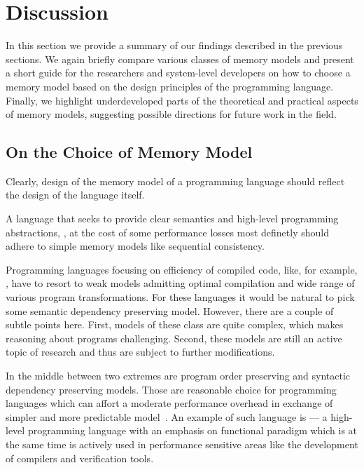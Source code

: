 \section{Discussion}
\label{sec:discussion}

In this section we provide a summary of our findings described in the previous sections. 
We again briefly compare various classes of memory models 
and present a short guide for the researchers and system-level developers 
on how to choose a memory model based 
on the design principles of the programming language.   
Finally, we highlight underdeveloped parts of the theoretical
and practical aspects of memory models, suggesting 
possible directions for future work in the field. 


\subsection{On the Choice of  Memory Model}

Clearly, design of the memory model of a programming language
should reflect the design of the language itself. 

A language that seeks to provide clear semantics and 
high-level programming abstractions, \eg \Haskell, at the cost 
of some performance losses most definetly should 
adhere to simple memory models like sequential consistency. 

Programming languages focusing on efficiency 
of compiled code, like, for example, \CPP, 
have to resort to weak models admitting 
optimal compilation and wide range of 
various program transformations. 
For these languages it would be natural 
to pick some semantic dependency preserving model. 
However, there are a couple of subtle points here. 
First, models of these class are quite complex, 
which makes reasoning about programs challenging. 
Second, these models are still an active topic 
of research and thus are subject to further modifications.

In the middle between two extremes are program order preserving and 
syntactic dependency preserving models.
Those are reasonable choice for programming languages
which can affort a moderate performance overhead 
in exchange of simpler and more predictable model~\cite{Ou-Demsky:OOPSLA18}.
An example of such language is \OCaml --- 
a high-level programming language 
with an emphasis on functional paradigm which is 
at the same time is actively used in performance sensitive areas
like the development of compilers and verification tools. 

